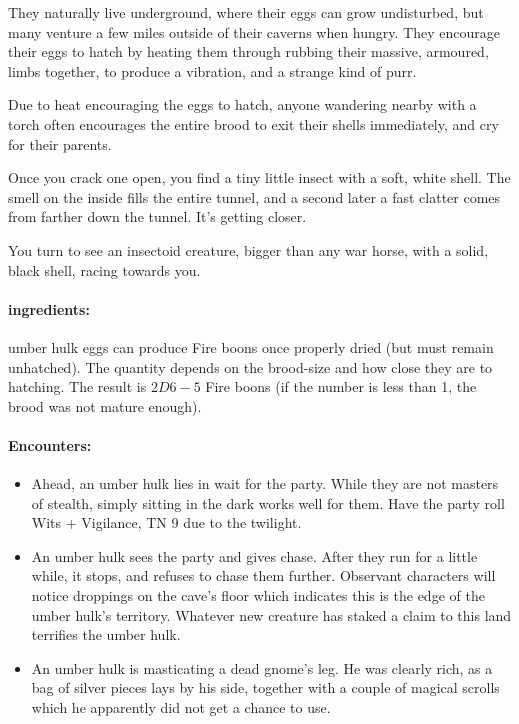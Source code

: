 \begin{multicols}{2}
They naturally live underground, where their eggs can grow undisturbed, but many venture a few miles outside of their caverns when hungry.
They encourage their eggs to hatch by heating them through rubbing their massive, armoured, limbs together, to produce a vibration, and a strange kind of purr.

Due to heat encouraging the eggs to hatch, anyone wandering nearby with a torch often encourages the entire brood to exit their shells immediately, and cry for their parents.

\begin{boxtext}

  Once you crack one open, you find a tiny little insect with a soft, white shell.
  The smell on the inside fills the entire tunnel, and a second later a fast clatter comes from farther down the tunnel.
  It's getting closer.

  You turn to see an insectoid creature, bigger than any war horse, with a solid, black shell, racing towards you.

\end{boxtext}

\paragraph{\Glspl{ingredient}:}
umber hulk eggs can produce Fire \glspl{boon} once properly dried (but must remain unhatched).
The quantity depends on the brood-size and how close they are to hatching.
The result is $2D6-5$ Fire \glspl{boon} (if the number is less than 1, the brood was not mature enough).

\paragraph{Encounters:}

\begin{itemize}

  \item
  Ahead, an umber hulk lies in wait for the party.
  While they are not masters of stealth, simply sitting in the dark works well for them.
  Have the party roll Wits + Vigilance, TN 9 due to the twilight.
  \item
  An umber hulk sees the party and gives chase.
  After they run for a little while, it stops, and refuses to chase them further.
  Observant characters will notice droppings on the cave's floor which indicates this is the edge of the umber hulk's territory.
  Whatever new creature has staked a claim to this land terrifies the umber hulk.
  \item
  An umber hulk is masticating a dead gnome's leg.
  He was clearly rich, as a bag of silver pieces lays by his side, together with a couple of magical scrolls which he apparently did not get a chance to use.


\end{itemize}
\end{multicols}
